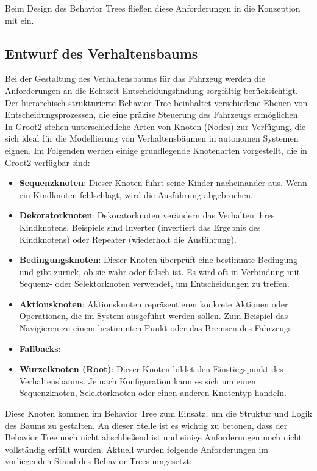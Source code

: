 Beim Design des Behavior Trees fließen diese Anforderungen in die Konzeption mit ein.

\newpage
\subsection{Entwurf des Verhaltensbaums}

Bei der Gestaltung des Verhaltensbaums für das Fahrzeug werden die Anforderungen an die Echtzeit-Entscheidungsfindung sorgfältig berücksichtigt. Der hierarchisch strukturierte Behavior Tree beinhaltet verschiedene Ebenen von Entscheidungsprozessen, die eine präzise Steuerung des Fahrzeugs ermöglichen.\\

In Groot2 stehen unterschiedliche Arten von Knoten (Nodes) zur Verfügung, die sich ideal für die Modellierung von Verhaltensbäumen in autonomen Systemen eignen. Im Folgenden werden einige grundlegende Knotenarten vorgestellt, die in Groot2 verfügbar sind:

\begin{itemize}
    \item \textbf{Sequenzknoten}: Dieser Knoten führt seine Kinder nacheinander aus. Wenn ein Kindknoten fehlschlägt, wird die Ausführung abgebrochen.
    \item \textbf{Dekoratorknoten}: Dekoratorknoten verändern das Verhalten ihres Kindknotens. Beispiele sind Inverter (invertiert das Ergebnis des Kindknotens) oder Repeater (wiederholt die Ausführung).
    \item \textbf{Bedingungsknoten}: Dieser Knoten überprüft eine bestimmte Bedingung und gibt zurück, ob sie wahr oder falsch ist. Es wird oft in Verbindung mit Sequenz- oder Selektorknoten verwendet, um Entscheidungen zu treffen.
    \item \textbf{Aktionsknoten}: Aktionsknoten repräsentieren konkrete Aktionen oder Operationen, die im System ausgeführt werden sollen. Zum Beispiel das Navigieren zu einem bestimmten Punkt oder das Bremsen des Fahrzeugs.
    \item \textbf{Fallbacks}:
    \item \textbf{Wurzelknoten (Root)}: Dieser Knoten bildet den Einstiegspunkt des Verhaltensbaums. Je nach Konfiguration kann es sich um einen Sequenzknoten, Selektorknoten oder einen anderen Knotentyp handeln.
\end{itemize}

Diese Knoten kommen im Behavior Tree zum Einsatz, um die Struktur und Logik des Baums zu gestalten. An dieser Stelle ist es wichtig zu betonen, dass der Behavior Tree noch nicht abschließend ist und einige Anforderungen noch nicht vollständig erfüllt wurden. Aktuell wurden folgende Anforderungen im vorliegenden Stand des Behavior Trees umgesetzt:\\


